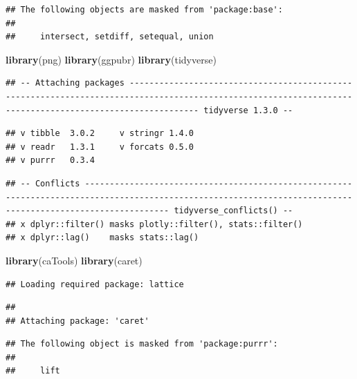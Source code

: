 \documentclass[
]{article}
\newenvironment{Shaded}{\begin{snugshade}}{\end{snugshade}}
\newcommand{\KeywordTok}[1]{\textcolor[rgb]{0.13,0.29,0.53}{\textbf{#1}}}
\newcommand{\NormalTok}[1]{#1}
\begin{document}
\begin{verbatim}
## The following objects are masked from 'package:base':
## 
##     intersect, setdiff, setequal, union
\end{verbatim}

\begin{Shaded}
\begin{Highlighting}[]
\KeywordTok{library}\NormalTok{(png)}
\KeywordTok{library}\NormalTok{(ggpubr)}
\KeywordTok{library}\NormalTok{(tidyverse)}
\end{Highlighting}
\end{Shaded}

\begin{verbatim}
## -- Attaching packages ---------------------------------------------------------------------------------------------------------------------------------------------------------- tidyverse 1.3.0 --
\end{verbatim}

\begin{verbatim}
## v tibble  3.0.2     v stringr 1.4.0
## v readr   1.3.1     v forcats 0.5.0
## v purrr   0.3.4
\end{verbatim}

\begin{verbatim}
## -- Conflicts ------------------------------------------------------------------------------------------------------------------------------------------------------------- tidyverse_conflicts() --
## x dplyr::filter() masks plotly::filter(), stats::filter()
## x dplyr::lag()    masks stats::lag()
\end{verbatim}

\begin{Shaded}
\begin{Highlighting}[]
\KeywordTok{library}\NormalTok{(caTools)}
\KeywordTok{library}\NormalTok{(caret)}
\end{Highlighting}
\end{Shaded}

\begin{verbatim}
## Loading required package: lattice
\end{verbatim}

\begin{verbatim}
## 
## Attaching package: 'caret'
\end{verbatim}

\begin{verbatim}
## The following object is masked from 'package:purrr':
## 
##     lift
\end{verbatim}
\end{document}
